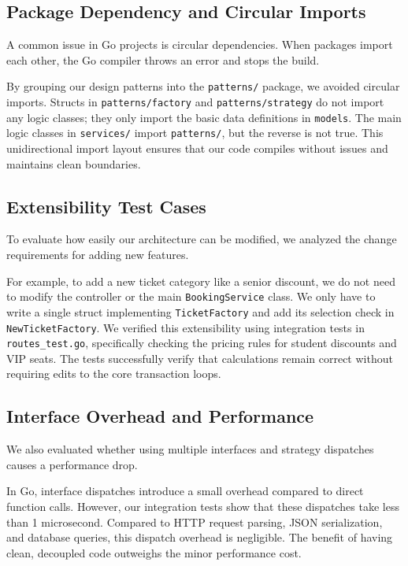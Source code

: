 \documentclass[conference]{IEEEtran}
\begin{document}
\subsection{Package Dependency and Circular Imports}

A common issue in Go projects is circular dependencies. When packages import each other, the Go compiler throws an error and stops the build. 

By grouping our design patterns into the \texttt{patterns/} package, we avoided circular imports. Structs in \texttt{patterns/factory} and \texttt{patterns/strategy} do not import any logic classes; they only import the basic data definitions in \texttt{models}. The main logic classes in \texttt{services/} import \texttt{patterns/}, but the reverse is not true. This unidirectional import layout ensures that our code compiles without issues and maintains clean boundaries.

\subsection{Extensibility Test Cases}

To evaluate how easily our architecture can be modified, we analyzed the change requirements for adding new features. 

For example, to add a new ticket category like a senior discount, we do not need to modify the controller or the main \texttt{BookingService} class. We only have to write a single struct implementing \texttt{TicketFactory} and add its selection check in \texttt{NewTicketFactory}. We verified this extensibility using integration tests in \texttt{routes\_test.go}, specifically checking the pricing rules for student discounts and VIP seats. The tests successfully verify that calculations remain correct without requiring edits to the core transaction loops.

\subsection{Interface Overhead and Performance}

We also evaluated whether using multiple interfaces and strategy dispatches causes a performance drop. 

In Go, interface dispatches introduce a small overhead compared to direct function calls. However, our integration tests show that these dispatches take less than 1 microsecond. Compared to HTTP request parsing, JSON serialization, and database queries, this dispatch overhead is negligible. The benefit of having clean, decoupled code outweighs the minor performance cost.
\end{document}
